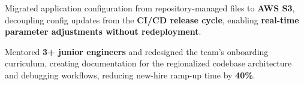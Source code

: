 \begin{cventries}
{\begin{cvitems}
        \item {Migrated application configuration from repository-managed files to \textbf{AWS S3}, decoupling config updates from the \textbf{CI/CD release cycle}, enabling \textbf{real-time parameter adjustments without redeployment}.}
        \item {Mentored \textbf{3+ junior engineers} and redesigned the team's onboarding curriculum, creating documentation for the regionalized codebase architecture and debugging workflows, reducing new-hire ramp-up time by \textbf{40\%}.}
      \end{cvitems}
    }



\end{cventries}
